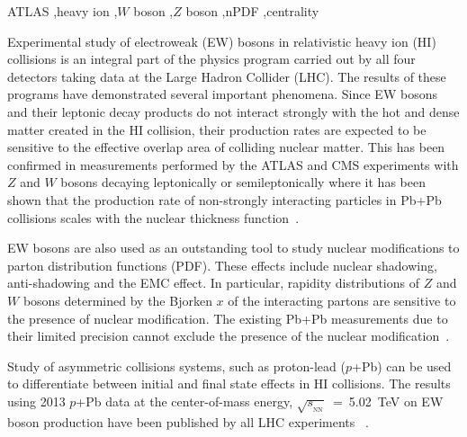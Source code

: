 \documentclass[3p,times,twocolumn]{elsarticle}
\newcommand*{\pPb}{\ensuremath{p}+Pb\xspace}
\newcommand*{\PbPb}{Pb+Pb\xspace}
\newcommand*{\Zboson}{\ensuremath{Z}\xspace}
\newcommand*{\Wboson}{\ensuremath{W}\xspace}
\newcommand*{\pp}{\ensuremath{pp}\xspace}
\newcommand*{\sqn}{\ensuremath{\sqrt{s_{_{\mathrm{NN}}}}}\xspace}
\newcommand*{\TeV}{\mbox{TeV}\xspace}
\begin{document}
\begin{frontmatter}
\begin{abstract}
\end{abstract}

\begin{keyword}
ATLAS \sep heavy ion \sep \Wboson boson \sep \Zboson boson \sep nPDF \sep centrality

\end{keyword}

\end{frontmatter}


Experimental study of electroweak (EW) bosons in relativistic heavy ion (HI) collisions is an integral part of the physics program carried out by all four detectors taking data at the Large Hadron Collider (LHC). The results of these programs have demonstrated several important phenomena. Since EW bosons and their leptonic decay products do not interact strongly with the hot and dense matter created in the HI collision, their production rates are expected to be sensitive to the effective overlap area of colliding nuclear matter. This has been confirmed in measurements performed by the ATLAS and CMS experiments with \Zboson and \Wboson bosons decaying leptonically or semileptonically where it has been shown that the production rate of non-strongly interacting particles in \PbPb collisions scales with the nuclear thickness function~\cite{Aad:2012ew,Aad:2014bha,Aad:2015lcb,Chatrchyan:2011ua,Chatrchyan:2012nt}. \par
EW bosons are also used as an outstanding tool to study nuclear modifications to parton distribution functions (PDF). These effects include nuclear shadowing, anti-shadowing and the EMC effect. In particular, rapidity distributions of \Zboson and \Wboson bosons determined by the Bjorken $x$ of the interacting partons are sensitive to the presence of nuclear modification. The existing \PbPb measurements due to their limited precision cannot exclude the presence of the nuclear modification~\cite{Aad:2012ew,Aad:2014bha,Aad:2015lcb,Chatrchyan:2011ua,Chatrchyan:2012nt}. \par 
Study of asymmetric collisions systems, such as proton-lead (\pPb) can be used to differentiate between initial and final state effects in HI collisions. The results using 2013 \pPb data at the center-of-mass energy, \sqn ~=~5.02~\TeV on EW boson production have been published by all LHC experiments ~\cite{Aad:2015gta,Khachatryan:2015pzs,Khachatryan:2015hha,Alice:2016wka,Aaij:2014pvu}. %
\end{document}
